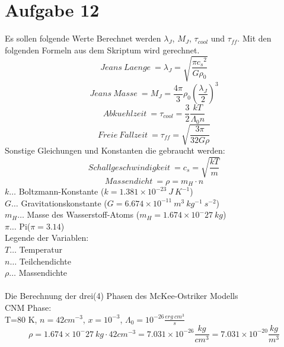 \section{Aufgabe 12}
Es sollen folgende Werte Berechnet werden $\lambda_J$, $M_J$, $\tau_{cool}$ und $\tau_{ff}$. Mit den folgenden Formeln aus dem Skriptum wird gerechnet.
\begin{equation}{Jeans ~ Laenge ~ }
= \lambda_{J}=\sqrt{\frac{\pi {c_s}^2}{G \rho_0}}
\end{equation}
\begin{equation}{Jeans ~ Masse ~ }
= M_{J}=\frac{4 \pi}{3} \rho_0 \left ( \frac{\lambda_J}{2} \right)^3
\end{equation}
\begin{equation}{Abkuehlzeit ~ }
= \tau_{cool}=\frac{3}{2} \frac{k T}{\Lambda_0 n}
\end{equation}
\begin{equation}{Freie ~ Fallzeit ~ }
= \tau_{ff}=\sqrt{\frac{3 \pi}{32 G \rho}}
\end{equation}
Sonstige Gleichungen und Konstanten die gebraucht werden:
\begin{equation}{Schallgeschwindigkeit ~ }
= c_{s}=\sqrt{\frac{k T}{m}}
\end{equation}
\begin{equation}{Massendicht ~ }
= \rho=m_H \cdot n
\end{equation}
\(k\dots\) Boltzmann-Konstante (\(k = 1.381 \times 10^{-23}~J~K^{-1}\))\\
\(G\dots\) Gravitationskonstante (\(G = 6.674 \times 10^{-11}~m^3~kg^{-1}~s^{-2}\))\\
\(m_H\dots\) Masse des Wasserstoff-Atoms (\(m_H = 1.674 \times 10^-27~kg\))\\
\(\pi\dots\) Pi(\(\pi=3.14\))\\
Legende der Variablen:\\
\(T\dots\) Temperatur\\
\(n\dots\) Teilchendichte\\
\(\rho\dots\) Massendichte\\
\\
Die Berechnung der drei(4) Phasen des McKee-Ostriker Modells \\
CNM Phase: \\
T=80 K, $n = 42 cm^{-3}$, $x=10^{-3}$, $\Lambda_0 = 10^{-26} \frac{erg~cm^3}{s}$\\
\begin{equation}
\rho=1.674 \times 10^-27~kg \cdot 42 cm^{-3} = 7.031 \times 10^{-26} \frac{kg}{cm^3}=7.031 \times 10^{-20} \frac{kg}{m^3}
\end{equation}
